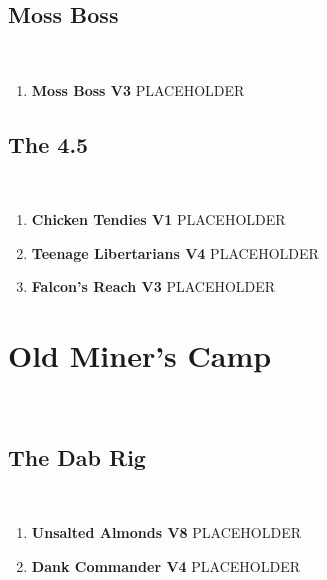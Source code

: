 \subsection*{Moss Boss}\label{bf:Moss Boss}
\

\begin{enumerate}[resume]
	\item\label{rt:Moss Boss} \colorbox{green!20}{\textbf{Moss Boss V3    } }
	\newline PLACEHOLDER\
\end{enumerate}
\subsection*{The 4.5}\label{bf:The 4.5}
\

\begin{enumerate}[resume]
	\item\label{rt:Chicken Tendies} \colorbox{green!20}{\textbf{Chicken Tendies V1   } }
	\newline PLACEHOLDER\
	\item\label{rt:Teenage Libertarians} \colorbox{RoyalBlue!20}{\textbf{Teenage Libertarians V4      } }
	\newline PLACEHOLDER\
	\item\label{rt:Falcon's Reach} \colorbox{green!20}{\textbf{Falcon's Reach V3    } }
	\newline PLACEHOLDER\
\end{enumerate}
\section{Old Miner's Camp}\label{sa:Old Miner's Camp}
\

\subsection*{The Dab Rig}\label{bf:The Dab Rig}
\

\begin{enumerate}[]
	\item\label{rt:Unsalted Almonds} \colorbox{Goldenrod!50}{\textbf{Unsalted Almonds V8  } }
	\newline PLACEHOLDER\
	\item\label{rt:Dank Commander} \colorbox{RoyalBlue!20}{\textbf{Dank Commander V4  } }
	\newline PLACEHOLDER\
\end{enumerate}
\clearpage